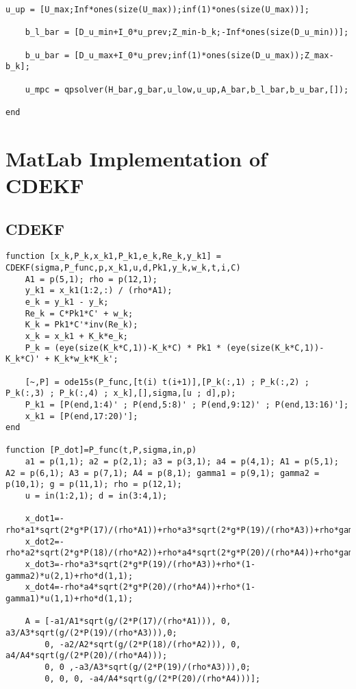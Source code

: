 \begin{bilag}
\begin{appendices}
\begin{lstlisting}[breaklines]
    u_up = [U_max;Inf*ones(size(U_max));inf(1)*ones(size(U_max))];
    
    b_l_bar = [D_u_min+I_0*u_prev;Z_min-b_k;-Inf*ones(size(D_u_min))];
    
    b_u_bar = [D_u_max+I_0*u_prev;inf(1)*ones(size(D_u_max));Z_max-b_k];
    
    u_mpc = qpsolver(H_bar,g_bar,u_low,u_up,A_bar,b_l_bar,b_u_bar,[]);

end
\end{lstlisting}

\section{MatLab Implementation of CDEKF}
\subsection{CDEKF }
\label{app:CDEKF}
\begin{lstlisting}[breaklines]
function [x_k,P_k,x_k1,P_k1,e_k,Re_k,y_k1] = CDEKF(sigma,P_func,p,x_k1,u,d,Pk1,y_k,w_k,t,i,C)
    A1 = p(5,1); rho = p(12,1);
    y_k1 = x_k1(1:2,:) / (rho*A1);
    e_k = y_k1 - y_k;
    Re_k = C*Pk1*C' + w_k;
    K_k = Pk1*C'*inv(Re_k);
    x_k = x_k1 + K_k*e_k;
    P_k = (eye(size(K_k*C,1))-K_k*C) * Pk1 * (eye(size(K_k*C,1))-K_k*C)' + K_k*w_k*K_k';

    [~,P] = ode15s(P_func,[t(i) t(i+1)],[P_k(:,1) ; P_k(:,2) ; P_k(:,3) ; P_k(:,4) ; x_k],[],sigma,[u ; d],p);
    P_k1 = [P(end,1:4)' ; P(end,5:8)' ; P(end,9:12)' ; P(end,13:16)'];
    x_k1 = [P(end,17:20)'];
end

function [P_dot]=P_func(t,P,sigma,in,p)
    a1 = p(1,1); a2 = p(2,1); a3 = p(3,1); a4 = p(4,1); A1 = p(5,1); A2 = p(6,1); A3 = p(7,1); A4 = p(8,1); gamma1 = p(9,1); gamma2 = p(10,1); g = p(11,1); rho = p(12,1);
    u = in(1:2,1); d = in(3:4,1);
        
    x_dot1=-rho*a1*sqrt(2*g*P(17)/(rho*A1))+rho*a3*sqrt(2*g*P(19)/(rho*A3))+rho*gamma1*u(1,1);
    x_dot2=-rho*a2*sqrt(2*g*P(18)/(rho*A2))+rho*a4*sqrt(2*g*P(20)/(rho*A4))+rho*gamma2*u(2,1);
    x_dot3=-rho*a3*sqrt(2*g*P(19)/(rho*A3))+rho*(1-gamma2)*u(2,1)+rho*d(1,1);
    x_dot4=-rho*a4*sqrt(2*g*P(20)/(rho*A4))+rho*(1-gamma1)*u(1,1)+rho*d(1,1);

    A = [-a1/A1*sqrt(g/(2*P(17)/(rho*A1))), 0, a3/A3*sqrt(g/(2*P(19)/(rho*A3))),0;
        0, -a2/A2*sqrt(g/(2*P(18)/(rho*A2))), 0, a4/A4*sqrt(g/(2*P(20)/(rho*A4)));
        0, 0 ,-a3/A3*sqrt(g/(2*P(19)/(rho*A3))),0;
        0, 0, 0, -a4/A4*sqrt(g/(2*P(20)/(rho*A4)))];


\end{lstlisting}
\end{appendices}
\end{bilag}
